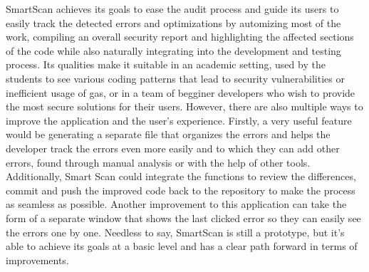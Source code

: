 SmartScan achieves its goals to ease the audit process and guide its users to easily track the detected errors and optimizations by automizing most of the work, compiling an overall security report and highlighting the affected sections of the code while also naturally integrating into the development and testing process. Its qualities make it suitable in an academic setting, used by the students to see various coding patterns that lead to security vulnerabilities or inefficient usage of gas, or in a team of begginer developers who wish to provide the most secure solutions for their users. However, there are also multiple ways to improve the application and the user's experience. Firstly, a very useful feature would be generating a separate file that organizes the errors and helps the developer track the errors even more easily and to which they can add other errors, found through manual analysis or with the help of other tools. Additionally, Smart Scan could integrate the functions to review the differences, commit and push the improved code back to the repository to make the process as seamless as possible. Another improvement to this application can take the form of a separate window that shows the last clicked error so they can easily see the errors one by one. Needless to say, SmartScan is still a prototype, but it's able to achieve its goals at a basic level and has a clear path forward in terms of improvements.


